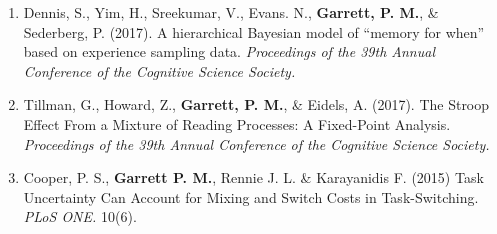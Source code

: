 \documentclass[12pt,oneside]{Thesis}
\begin{document}
{\begin{enumerate}
\item Dennis, S., Yim, H., Sreekumar, V., Evans. N., \textbf{Garrett, P. M.}, \& Sederberg, P. (2017). A hierarchical Bayesian model of ``memory for when'' based on experience sampling data. \emph{Proceedings of the 39th Annual Conference of the Cognitive Science Society.}

\item Tillman, G., Howard, Z., \textbf{Garrett, P. M.}, \& Eidels, A. (2017). The Stroop Effect From a Mixture of Reading Processes: A Fixed-Point Analysis. \emph{Proceedings of the 39th Annual Conference of the Cognitive Science Society.}

\item Cooper, P. S., \textbf{Garrett P. M.}, Rennie J. L. \& Karayanidis F. (2015) Task Uncertainty Can Account for Mixing and Switch Costs in Task-Switching. \emph{PLoS ONE.} 10(6).
\end{enumerate}
}
\clearpage
\end{document}
